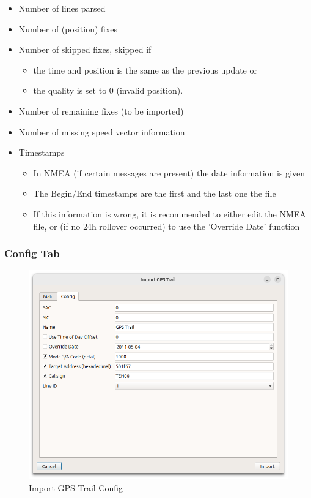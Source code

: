 \begin{itemize}
\item Number of lines parsed
\item Number of (position) fixes
\item Number of skipped fixes, skipped if
\begin{itemize}
\item the time  and position is the same as the previous update or
\item the quality is set to 0 (invalid position).
\end{itemize}
\item Number of remaining fixes (to be imported)
\item Number of missing speed vector information
\item Timestamps
\begin{itemize}
\item In NMEA (if certain messages are present) the date information is given
\item The Begin/End timestamps are the first and the last one the file
\item If this information is wrong, it is recommended to either edit the NMEA file, or (if no 24h rollover occurred) to use the 'Override Date' function
\end{itemize}
\end{itemize}

\subsubsection{Config Tab}

\begin{figure}[H]
    \includegraphics[width=16cm]{figures/gps_import_config.png}
  \caption{Import GPS Trail Config}
\end{figure}

